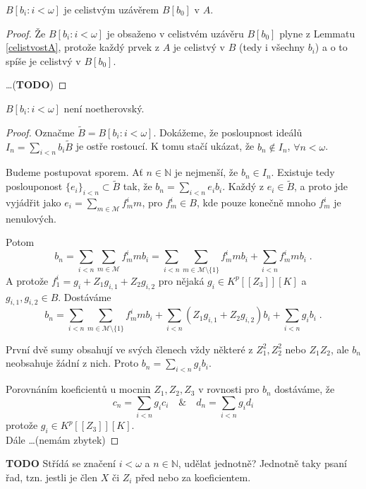 \documentclass[11pt,a4paper]{article}
\newcommand\m[1]{\mathbb { #1 }} %
\newcommand\p[1]{\mathcal{ #1 }} %
\newcommand\N{\m N}
\theoremstyle{definition}
\theoremstyle{plain}
\begin{document}
\veta $B[b_i : i < \omega]$ je celistvým uzávěrem $B[b_0]$ v $A$.
\begin{proof}
	Že $B[b_i : i < \omega]$ je obsaženo v celistvém uzávěru $B[b_0]$ plyne z
	Lemmatu \ref{celistvostA}, protože každý prvek z $A$ je celistvý v $B$
	(tedy i všechny $b_i$) a o to spíše je celistvý v $B[b_0]$.

	\dots (\textbf{TODO})
\end{proof}


\veta $B[b_i : i < \omega]$ není noetherovský.
\begin{proof}
	Označme $\tilde{B} = B[b_i : i < \omega]$. Dokážeme, že posloupnost
	ideálů $I_n = \sum_{i < n} b_i \tilde{B}$ je ostře rostoucí. K tomu
	stačí ukázat, že $b_n \notin I_n$, $\forall n < \omega$.

	Budeme postupovat sporem. Ať $n \in \N$ je nejmenší, že $b_n \in I_n$.
	Existuje tedy poslouponost $\{e_i\}_{i < n} \subset \tilde B$ tak, že
	$b_n = \sum_{i < n} e_i b_i$. Každý z $e_i \in \tilde B$, a proto jde
	vyjádřit jako $e_i = \sum_{m \in \p M} f^i_m m$, pro $f^i_m \in B$, kde
	pouze konečně mnoho $f^i_m$ je nenulových.

	Potom
	\[
	b_n = \sum_{i < n} \sum_{m \in \p M} f^i_m m b_i = \sum_{i < n} \sum_{m \in
	\p M \setminus \{1\}} f^i_m m b_i + \sum_{i < n} f^i_m m b_i \;.
	\]
	A protože $f^i_1 = g_i + Z_1 g_{i,1} + Z_2 g_{i,2}$ pro nějaká $g_i \in
	K^p[[Z_3]][K]$ a $g_{i,1}, g_{i,2} \in B$. Dostáváme
	\[
	b_n = \sum_{i < n} \sum_{m \in \p M \setminus \{1\}} f^i_m m b_i +
	\sum_{i<n} \left(Z_1 g_{i,1} + Z_2 g_{i,2}\right)b_i + \sum_{i<n} g_i b_i
	\;.
	\]

	První dvě sumy obsahují ve svých členech vždy některé z $Z_1^2, Z_2^2$ nebo
	$Z_1 Z_2$, ale $b_n$ neobsahuje žádní z nich. Proto $b_n = \sum_{i<n} g_i
	b_i$.

	Porovnáním koeficientů u mocnin $Z_1, Z_2, Z_3$ v rovnosti pro $b_n$
	dostáváme, že
	\[
	c_n = \sum_{i<n} g_i c_i \quad \& \quad d_n = \sum_{i<n} g_i d_i
	\]
	protože $g_i \in K^p[[Z_3]][K]$.
	\\

	Dále \dots (nemám zbytek)
\end{proof}

\textbf{TODO} Střídá se značení $i < \omega$ a $n \in \N$, udělat jednotně?
Jednotně taky psaní řad, tzn. jestli je člen $X$ či $Z_i$ před nebo za
koeficientem.
\end{document}
